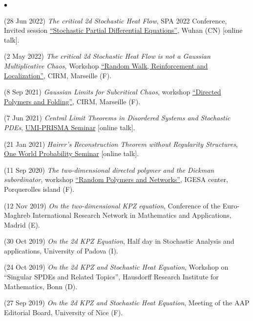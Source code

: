 \documentclass[a4paper,11pt,oneside]{amsart}
\newenvironment{myitemize}{%
\begin{list}{$\bullet$}%
 	{%
	\setlength{\itemsep}{0.3em}%
	\setlength{\topsep}{0.3em}%
	\setlength{\partopsep}{0em}%
	\setlength{\parsep}{0em}%
	\setlength{\parskip}{0em}%
	\setlength\leftmargin{1.5em}%
	\setlength\labelwidth{1.1em}%
	\setlength{\labelsep}{0.4em}%
	}%
	}%
{\end{list}}
\renewenvironment{itemize}{
\begin{myitemize}}%
{\end{myitemize}}
\begin{document}
\begin{itemize}
\item (28 Jun 2022)
\emph{The critical 2d Stochastic Heat Flow},
SPA 2022 Conference, Invited session 
\href{https://spa2022.whu.edu.cn/Programme/Invited_sessions.htm}{``Stochastic 
Partial Differential Equations''},
Wuhan (CN) [online talk].

\item (2 May 2022)
\emph{The critical 2d Stochastic Heat Flow is not a Gaussian Multiplicative Chaos},
Workshop \href{https://conferences.cirm-math.fr/2799.html}{``Random Walk, 
Reinforcement and Localization''},
CIRM, Marseille (F).

\item (8 Sep 2021)
\emph{Gaussian Limits for Subcritical Chaos},
workshop \href{https://conferences.cirm-math.fr/2124.html}{``Directed Polymers and Folding''}, 
CIRM, Marseille (F).

\item (7 Jun 2021)
\emph{Central Limit Theorems in Disordered Systems and Stochastic PDEs},
\href{http://www.umi-prisma.polito.it/webinars.html}{UMI-PRISMA Seminar} [online talk].

\item (21 Jan 2021)
\emph{Hairer's Reconstruction Theorem without Regularity Structures},
\href{https://www.owprobability.org/one-world-probability-seminar/past-seminars#h.fejiyznu0y15}{One 
World Probability Seminar} [online talk].

\item (11 Sep 2020)
\emph{The two-dimensional directed polymer 
and the Dickman subordinator},
workshop \href{https://perso.math.u-pem.fr/asselah.amine/PORQ2020.html}{``Random Polymers 
and Networks''}, IGESA center, Porquerolles island (F).

\item (12 Nov 2019)
\emph{On the two-dimensional KPZ equation},
Conference of the Euro-Maghreb 
International Research Network in Mathematics and Applications,
Madrid (E).

\item (30 Oct 2019)
\emph{On the 2d KPZ Equation},
Half day in Stochastic Analysis and applications,
University of Padova (I).

\item (24 Oct 2019)
\emph{On the 2d KPZ and Stochastic Heat Equation},
Workshop on ``Singular SPDEs and Related Topics'',
Hausdorff Research Institute for Mathematics, Bonn (D).

\item (27 Sep 2019)
\emph{On the 2d KPZ and Stochastic Heat Equation},
Meeting of the AAP Editorial Board,
University of Nice (F).


\end{itemize}
\end{document}
